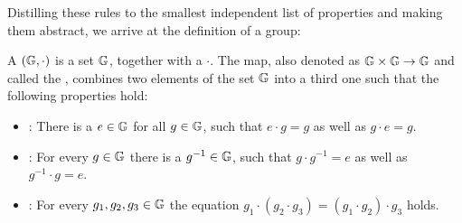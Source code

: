 Distilling these rules to the smallest independent list of properties and making them abstract, we arrive at the definition of a group:

\begin{definition}
A  $(\mathbb{G},\cdot) $ is a set $ \mathbb{G}$, together with a  $ \cdot$. The map, also denoted as $\mathbb{G} \times \mathbb{G} \to \mathbb{G} $ and called the , combines two elements of the set $ \mathbb{G}$ into a third one such that the following properties hold:
\begin{itemize}
\item {}: There is a $e\in\mathbb{G}$ for all $g\in\mathbb{G}$, such that $e\cdot g=g$ as well as $g\cdot e = g$.
\item {}: For every $g\in\mathbb{G}$ there is a $g^{-1}\in\mathbb{G}$, such that $g\cdot g^{-1}=e$ as well as $g^{-1}\cdot g = e$.
\item {}: For every $g_1,g_2,g_3\in\mathbb{G}$ the equation
$g_1\cdot(g_2\cdot g_3) = (g_1\cdot g_2)\cdot g_3$ holds.
\end{itemize}
\end{definition}

